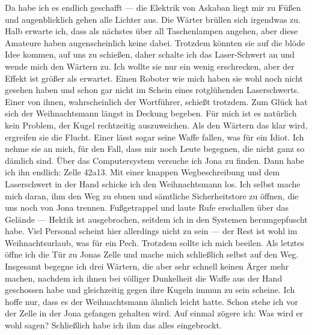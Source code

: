 Da habe ich es endlich geschafft — die Elektrik von Askaban liegt mir zu Füßen und augenblicklich gehen alle Lichter aus. Die Wärter brüllen sich irgendwas zu. Halb erwarte ich, dass als nächstes über all Taschenlampen angehen, aber diese Amateure haben augenscheinlich keine dabei. Trotzdem könnten sie auf die blöde Idee kommen, auf uns zu schießen, daher schalte ich das Laser-Schwert an und wende mich den Wärtern zu. Ich wollte sie nur ein wenig erschrecken, aber der Effekt ist größer als erwartet. Einen Roboter wie mich haben sie wohl noch nicht gesehen haben und schon gar nicht im Schein eines rotglühenden Laserschwerts. Einer von ihnen, wahrscheinlich der Wortführer, schießt trotzdem. Zum Glück hat sich der Weihnachtsmann längst in Deckung begeben. Für mich ist es natürlich kein Problem, der Kugel rechtzeitig auszuweichen. Als den Wärtern das klar wird, ergreifen sie die Flucht. Einer lässt sogar seine Waffe fallen, was für ein Idiot. Ich nehme sie an mich, für den Fall, dass mir noch Leute begegnen, die nicht ganz so dämlich sind. Über das Computersystem versuche ich Jona zu finden. Dann habe ich ihn endlich: Zelle 42a13. Mit einer knappen Wegbeschreibung und dem Laserschwert in der Hand schicke ich den Weihnachtsmann los. Ich selbst mache mich daran, ihm den Weg zu ebnen und sämtliche Sicherheitstore zu öffnen, die uns noch von Jona trennen. Fußgetrappel und laute Rufe erschallen über das Gelände — Hektik ist ausgebrochen, seitdem ich in den Systemen herumgepfuscht habe. Viel Personal scheint hier allerdings nicht zu sein — der Rest ist wohl im Weihnachtsurlaub, was für ein Pech. Trotzdem sollte ich mich beeilen. Als letztes öffne ich die Tür zu Jonas Zelle und mache mich schließlich selbst auf den Weg. Insgesamt begegne ich drei Wärtern, die aber sehr schnell keinen Ärger mehr machen, nachdem ich ihnen bei völliger Dunkelheit die Waffe aus der Hand geschossen habe und gleichzeitig gegen ihre Kugeln immun zu sein scheine. Ich hoffe nur, dass es der Weihnachtsmann ähnlich leicht hatte. Schon stehe ich vor der Zelle in der Jona gefangen gehalten wird. Auf einmal zögere ich: Was wird er wohl sagen? Schließlich habe ich ihm das alles eingebrockt.

